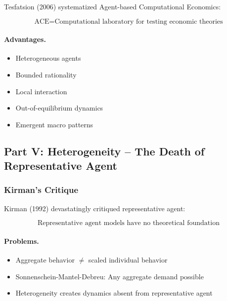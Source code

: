 Tesfatsion (2006) systematized Agent-based Computational Economics:

\begin{equation}
\text{ACE} = \text{Computational laboratory for testing economic theories}
\end{equation}

\paragraph{Advantages.}
\begin{itemize}
    \item Heterogeneous agents
    \item Bounded rationality
    \item Local interaction
    \item Out-of-equilibrium dynamics
    \item Emergent macro patterns
\end{itemize}

\subsection{Part V: Heterogeneity – The Death of Representative Agent}

\subsubsection{Kirman's Critique}

Kirman (1992) devastatingly critiqued representative agent:

\begin{equation}
\boxed{
\text{Representative agent models have no theoretical foundation}
}
\label{eq:kirman}
\end{equation}

\paragraph{Problems.}
\begin{itemize}
    \item Aggregate behavior $\neq$ scaled individual behavior
    \item Sonnenschein-Mantel-Debreu: Any aggregate demand possible
    \item Heterogeneity creates dynamics absent from representative agent
\end{itemize}

